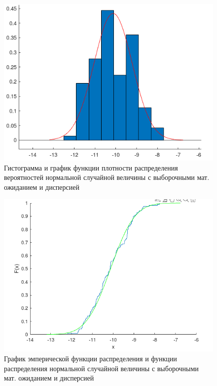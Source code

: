 \documentclass[12pt]{report}
\begin{document}
\begin{figure}[H]
	\centering
	\includegraphics[scale=0.7]{img/1.png}
	\caption{Гистограмма и график функции плотности распределения вероятностей нормальной случайной величины с выборочными мат. ожиданием и дисперсией}
	\label{fig:1}
\end{figure}

\begin{figure}[H]
	\centering
	\includegraphics[scale=0.7]{img/2.png}
	\caption{График эмперической функции распределения и функции распределения нормальной случайной величины с выборочными мат. ожиданием и дисперсией}
	\label{fig:2}
\end{figure}

	
\end{document}
